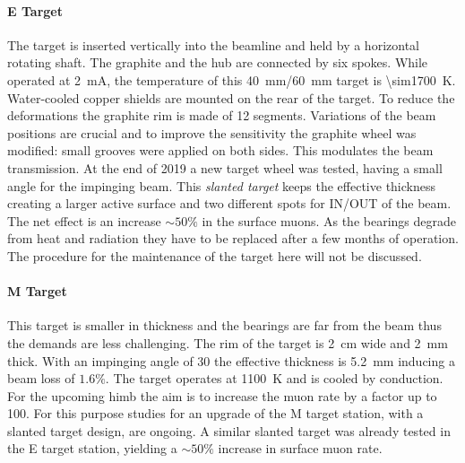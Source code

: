 \begin{refsection}
        \paragraph{E Target}
        The target is inserted vertically into the beamline and held by a horizontal rotating shaft. The graphite and the hub are connected by six spokes. 
        While operated at \SI{2}{mA}, the temperature of this \SI{40}{mm}/\SI{60}{mm} target is \SI{\sim1700}{K}. Water-cooled copper shields are mounted on the rear of the target. To reduce the deformations the graphite rim is made of 12 segments. 
        Variations of the beam positions are crucial and to improve the sensitivity the graphite wheel was modified: small grooves were applied on both sides. This modulates the beam transmission.
        At the end of 2019 a new target wheel was tested, having a small angle for the impinging beam. 
        This \textit{slanted target} keeps the effective thickness creating a larger active surface and two different spots for IN/OUT of the beam. The net effect is an increase $\sim50\%$ in the surface muons.
        As the bearings degrade from heat and radiation they have to be replaced after a few months of operation. The procedure for the maintenance of the target here will not be discussed.
        
        \paragraph{M Target}
        This target is smaller in thickness and the bearings are far from the beam thus the demands are less challenging. 
        The rim of the target is \SI{2}{cm} wide and \SI{2}{mm} thick.  
        With an impinging angle of \SI{30}{\deg} the effective thickness is \SI{5.2}{mm} inducing a beam loss of $1.6\%$. 
        The target operates at \SI{1100}{K} and is cooled by conduction.
        For the upcoming \gls{himb} the aim is to increase the muon rate by a factor up to 100. 
        For this purpose studies for an upgrade of the M target station, with a slanted target design, are ongoing.
        A similar slanted target was already tested in the E target station, yielding a $\sim 50\%$ increase in surface muon rate.
        

\end{refsection}
